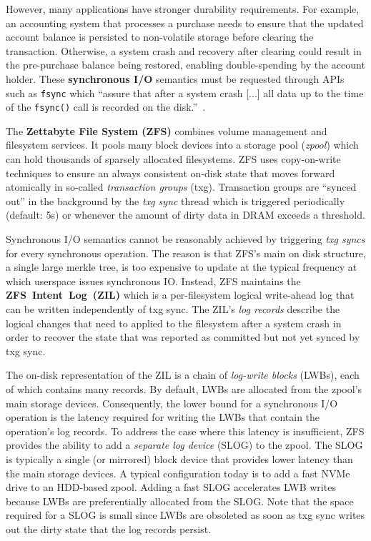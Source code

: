 \documentclass[12pt,a4paper,twoside]{book}
\begin{document}
However, many applications have stronger durability requirements.
For example, an accounting system that processes a purchase needs to ensure that the updated account balance is persisted to non-volatile storage before clearing the transaction.
Otherwise, a system crash and recovery after clearing could result in the pre-purchase balance being restored, enabling double-spending by the account holder.
These \textbf{synchronous I/O} semantics must be requested through APIs such as \lstinline{fsync} which ``assure that after a system crash [...] all data up to the time of the \lstinline{fsync()} call is recorded on the disk.''~\cite{OpenGroupFsync}.

The \textbf{Zettabyte File System (ZFS)} combines volume management and filesystem services.
It pools many block devices into a storage pool (\textit{zpool}) which can hold thousands of sparsely allocated filesystems.
ZFS uses copy-on-write techniques to ensure an always consistent on-disk state that moves forward atomically in so-called \textit{transaction groups} (txg).
Transaction groups are ``synced out'' in the background by the \textit{txg sync} thread which is triggered periodically (default: 5s) or whenever the amount of dirty data in DRAM exceeds a threshold.

Synchronous I/O semantics cannot be reasonably achieved by triggering \textit{txg syncs} for every synchronous operation.
The reason is that ZFS's main on disk structure, a single large merkle tree, is too expensive to update at the typical frequency at which userspace issues synchronous IO.
Instead, ZFS maintains the \mbox{\textbf{ZFS Intent Log (ZIL)}} which is a per-filesystem logical write-ahead log that can be written independently of txg sync.
The ZIL's \textit{log records} describe the logical changes that need to applied to the filesystem after a system crash in order to recover the state that was reported as committed but not yet synced by txg sync.

The on-disk representation of the ZIL is a chain of \textit{log-write blocks} (LWBs), each of which contains many records.
By default, LWBs are allocated from the zpool's main storage devices.
Consequently, the lower bound for a synchronous I/O operation is the latency required for writing the LWBs that contain the operation's log records.
To address the case where this latency is insufficient, ZFS provides the ability to add a \textit{separate log device} (SLOG) to the zpool.
The SLOG is typically a single (or mirrored) block device that provides lower latency than the main storage devices.
A typical configuration today is to add a fast NVMe drive to an HDD-based zpool.
Adding a fast SLOG accelerates LWB writes because LWBs are preferentially allocated from the SLOG.
Note that the space required for a SLOG is small since LWBs are obsoleted as soon as txg sync writes out the dirty state that the log records persist.
\end{document}
